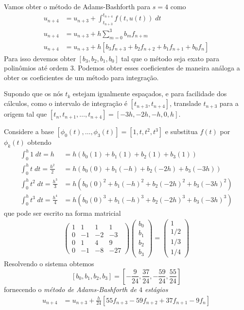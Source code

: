 \begin{ex}
Vamos obter o método de Adams-Bashforth para $s=4$ como
\begin{eqnarray}
  u_{n+4}  &= u_{n+3}  + \int _{t_{n+3}}^{t_{n+4}} f(t,u(t)) \; dt \\
  u_{n+4}  &= u_{n+3}  + h \sum_{m=0}^{3} b_m f_{n+m} \\
  u_{n+4}  &= u_{n+3}  + h [b_3f_{n+3} +b_2f_{n+2} +b_1f_{n+1} +b_0f_n]
\end{eqnarray}
Para isso devemos obter $[b_3,b_2,b_1,b_0]$ tal que o método seja exato para polinômios até ordem $3$. Podemos obter esses coeficientes de maneira análoga a obter os coeficientes de um método para integração.

Supondo que os nós $t_k$ estejam igualmente espaçados, e para facilidade dos cálculos, como o intervalo de integração é $[t_{n+3},t_{n+4}]$, translade $t_{n+3}$ para a origem tal que $[t_n,t_{n+1},\ldots ,t_{n+4}]=[-3h,-2h,-h,0,h]$.

Considere a base $[\phi _0(t),\ldots ,\phi _3(t)]=[1,t,t^2,t^3]$ e substitua $f(t)$ por $\phi _k(t)$ obtendo
\begin{eqnarray*}
  \int _0^{h} 1  \;dt = h             &= h( b_0(1)  +b_1(1)    + b_2(1)   + b_3(1)    )\\
  \int _0^{h} t  \;dt = \frac{h^2}{2}  &= h( b_0(0)  +b_1(-h)   + b_2(-2h) + b_3(-3h)  )\\
  \int _0^{h} t^2 \;dt = \frac{h^3}{3}  &= h( b_0(0)^2 +b_1(-h)^2  + b_2(-2h)^2+ b_3(-3h)^2 )\\
  \int _0^{h} t^3 \;dt = \frac{h^4}{4} &= h( b_0(0)^3 +b_1(-h)^3  + b_2(-2h)^3+ b_3(-3h)^3 )
\end{eqnarray*}
que pode ser escrito na forma matricial
\begin{eqnarray}
\left(
  \begin{array}{cccc}
    1  &  1    & 1   & 1\\
    0  &  -1   & -2  & -3\\
    0  &  1    & 4   &  9\\
    0  &  -1   & -8  & -27
  \end{array}
\right)
\left(\begin{array}{c}  b_0 \\ b_1\\ b_2\\b_3   \end{array}\right)
=
\left(\begin{array}{c}  1  \\ 1/2 \\ 1/3 \\ 1/4  \end{array}\right)
\end{eqnarray}
Resolvendo o sistema obtemos
$$[b_0,b_1,b_2,b_3]=[-\frac{9}{24},\frac{37}{24},-\frac{59}{24},\frac{55}{24}]$$
fornecendo o \emph{método de Adams-Bashforth de $4$ estágios}
\begin{eqnarray}\label{AB4}
  u_{n+4}  &= u_{n+3}  + \frac{h}{24} [55 f_{n+3} -59f_{n+2} +37f_{n+1} -9f_n]
\end{eqnarray}
\end{ex}

